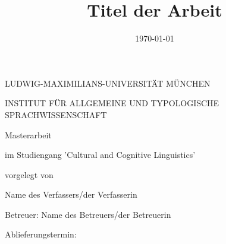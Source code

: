 \documentclass[12pt,letterpaper]{article} %
\begin{document}
\begin{center}\uppercase{Ludwig-Maximilians-Universität München}\end{center}
\begin{center}\uppercase{Institut für Allgemeine und Typologische Sprachwissenschaft}\end{center}

\vspace{3cm}


\title{Titel der Arbeit}
\date{\vspace{-5ex}}
{\let\newpage\relax\maketitle}
\thispagestyle{empty}


\begin{center}
\begin{large}
\begin{Large}
Masterarbeit\\
\end{Large}
im Studiengang 'Cultural and Cognitive Linguistics' \\
\end{large}
\end{center}
\begin{center}
vorgelegt von\\
\begin{large}
Name des Verfassers/der Verfasserin\\
\end{large}
\end{center}
\vspace{1cm}
\begin{center}
\begin{large}
Betreuer: Name des Betreuers/der Betreuerin\\
\end{large}
\end{center}

\begin{center}
\begin{large}
Ablieferungstermin: \date{\today} \\
\end{large}
\end{center}
\end{document}
